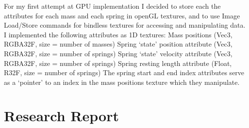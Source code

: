 \documentclass[]{acmsiggraph}
\begin{document}
For my first attempt at GPU implementation I decided to store each the attributes for each mass and each spring in openGL textures, and to use Image Load/Store commands for bindless textures for accessing and manipulating data. I implemented the following attributes as 1D textures:
Mass positions (Vec3, RGBA32F, size = number of masses)
Spring ‘state’ position attribute (Vec3, RGBA32F, size = number of springs)
Spring ‘state’ velocity attribute (Vec3, RGBA32F, size = number of springs)
Spring resting length attribute (Float, R32F, size = number of springs)
The spring start and end index attributes serve as a ‘pointer’ to an index in the mass positions texture which they manipulate.

\section{Research Report} \label{sec:report}



\end{document}
